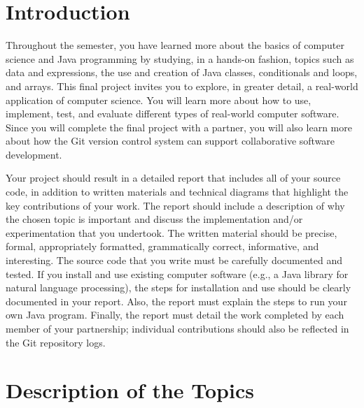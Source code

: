 


\usepackage[compact]{titlesec}


\vspace*{-.2in}

\section*{Introduction}

Throughout the semester, you have learned more about the basics of computer science and Java programming by studying, in
a hands-on fashion, topics such as data and expressions, the use and creation of Java classes, conditionals and loops,
and arrays.  This final project invites you to explore, in greater detail, a real-world application of computer science.
You will learn more about how to use, implement, test, and evaluate different types of real-world computer software.
Since you will complete the final project with a partner, you will also learn more about how the Git version control
system can support collaborative software development.

Your project should result in a detailed report that includes all of your source code, in addition to written materials
and technical diagrams that highlight the key contributions of your work.  The report should include a description of
why the chosen topic is important and discuss the implementation and/or experimentation that you undertook.  The written
material should be precise, formal, appropriately formatted, grammatically correct, informative, and interesting.  The
source code that you write must be carefully documented and tested.  If you install and use existing computer software
(e.g., a Java library for natural language processing),  the steps for installation and use should be clearly
documented in your report. Also, the report must explain the steps to run your own Java program.
Finally, the report must detail the work completed by each member of your partnership; individual contributions should
also be reflected in the Git repository logs.

\section*{Description of the Topics}

